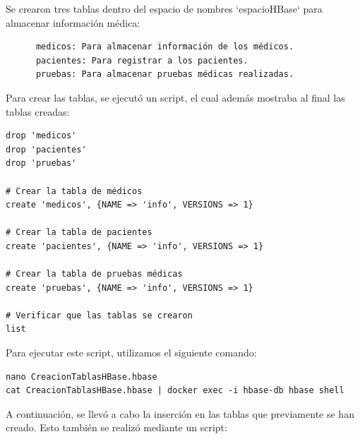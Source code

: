 \documentclass{article}
\begin{document}
Se crearon tres tablas dentro del espacio de nombres `espacioHBase` para almacenar información médica: 

\begin{verbatim}
      medicos: Para almacenar información de los médicos.
      pacientes: Para registrar a los pacientes.
      pruebas: Para almacenar pruebas médicas realizadas.
\end{verbatim}

Para crear las tablas, se ejecutó un script, el cual además mostraba al final las tablas creadas:

\begin{verbatim}
drop 'medicos'
drop 'pacientes'
drop 'pruebas'
    
# Crear la tabla de médicos
create 'medicos', {NAME => 'info', VERSIONS => 1}
    
# Crear la tabla de pacientes
create 'pacientes', {NAME => 'info', VERSIONS => 1}
    
# Crear la tabla de pruebas médicas
create 'pruebas', {NAME => 'info', VERSIONS => 1}
    
# Verificar que las tablas se crearon
list    
\end{verbatim}

Para ejecutar este script, utilizamos el siguiente comando:
\begin{lstlisting}[style=bashStyle]
nano CreacionTablasHBase.hbase
cat CreacionTablasHBase.hbase | docker exec -i hbase-db hbase shell
\end{lstlisting}

A continuación, se llevó a cabo la inserción en las tablas que previamente se han creado. Esto también se realizó mediante un script:
\end{document}
